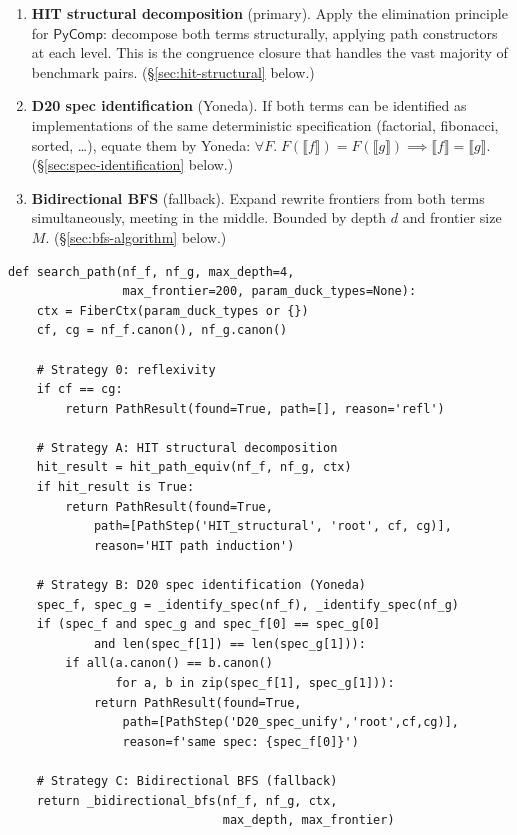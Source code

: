 \documentclass[11pt,a4paper]{report}
\theoremstyle{definition}
\theoremstyle{plain}
\newcommand{\den}[1]{\llbracket #1 \rrbracket}
\begin{document}
\begin{enumerate}[label=\textbf{Strategy \Alph*:},leftmargin=3.5em]
  \item \textbf{HIT structural decomposition} (primary).
    Apply the elimination principle for $\mathsf{PyComp}$:
    decompose both terms structurally, applying path constructors
    at each level.  This is the congruence closure that handles
    the vast majority of benchmark pairs.
    (\S\ref{sec:hit-structural} below.)
  \item \textbf{D20 spec identification} (Yoneda).
    If both terms can be identified as implementations of the
    same deterministic specification (factorial, fibonacci, sorted,
    \ldots), equate them by Yoneda:
    $\forall F.\; F(\den{f}) = F(\den{g}) \implies \den{f} = \den{g}$.
    (\S\ref{sec:spec-identification} below.)
  \item \textbf{Bidirectional BFS} (fallback).
    Expand rewrite frontiers from both terms simultaneously,
    meeting in the middle.  Bounded by depth $d$ and frontier
    size $M$.
    (\S\ref{sec:bfs-algorithm} below.)
\end{enumerate}

\begin{lstlisting}[caption={Three-strategy path search (implementation)}]
def search_path(nf_f, nf_g, max_depth=4,
                max_frontier=200, param_duck_types=None):
    ctx = FiberCtx(param_duck_types or {})
    cf, cg = nf_f.canon(), nf_g.canon()

    # Strategy 0: reflexivity
    if cf == cg:
        return PathResult(found=True, path=[], reason='refl')

    # Strategy A: HIT structural decomposition
    hit_result = hit_path_equiv(nf_f, nf_g, ctx)
    if hit_result is True:
        return PathResult(found=True,
            path=[PathStep('HIT_structural', 'root', cf, cg)],
            reason='HIT path induction')

    # Strategy B: D20 spec identification (Yoneda)
    spec_f, spec_g = _identify_spec(nf_f), _identify_spec(nf_g)
    if (spec_f and spec_g and spec_f[0] == spec_g[0]
            and len(spec_f[1]) == len(spec_g[1])):
        if all(a.canon() == b.canon()
               for a, b in zip(spec_f[1], spec_g[1])):
            return PathResult(found=True,
                path=[PathStep('D20_spec_unify','root',cf,cg)],
                reason=f'same spec: {spec_f[0]}')

    # Strategy C: Bidirectional BFS (fallback)
    return _bidirectional_bfs(nf_f, nf_g, ctx,
                              max_depth, max_frontier)
\end{lstlisting}
\end{document}

